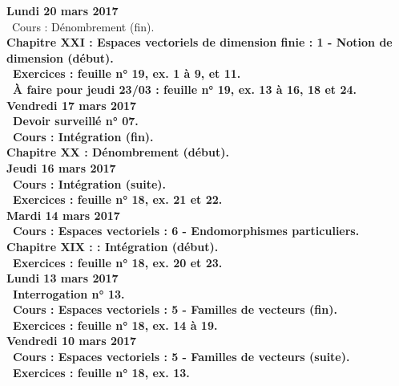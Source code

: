 \documentclass[12pt,a4paper]{article}
\begin{document}
\noindent\textbf{\bf Lundi 20 mars 2017} \\
\bu\ Cours : Dénombrement (fin).\\
\bf Chapitre XXI \rm : Espaces vectoriels de dimension finie  : 1 - Notion de dimension (début).\\
\bu\ Exercices : feuille n° 19, ex. 1 à 9, et 11.\\
\bu\ À faire pour jeudi 23/03 : feuille n° 19, ex. 13 à 16, 18 et 24.\vspace{.4cm}\\

\noindent\textbf{Vendredi 17 mars 2017}\\
\bu\ Devoir surveillé n° 07.\\
\bu\ Cours : Intégration (fin).\\
\bf Chapitre XX \rm : Dénombrement (début).\vspace{.4cm}\\

\noindent\textbf{Jeudi 16 mars 2017}\\
\bu\ Cours : Intégration (suite).\\
\bu\ Exercices : feuille n° 18, ex. 21 et 22.\vspace{.4cm}\\

\noindent\textbf{\bf Mardi 14 mars 2017} \\
\bu\ Cours : Espaces vectoriels : 6 - Endomorphismes particuliers.\\
\bf Chapitre XIX : \rm : Intégration (début).\\
\bu\ Exercices : feuille n° 18, ex. 20 et 23.\vspace{.4cm}\\

\noindent\textbf{\bf Lundi 13 mars 2017} \\
\bu\ Interrogation n° 13.\\
\bu\ Cours : Espaces vectoriels : 5 - Familles de vecteurs (fin).\\
\bu\ Exercices : feuille n° 18, ex. 14 à 19.\vspace{.4cm}\\

\noindent\textbf{Vendredi 10 mars 2017}\\
\bu\ Cours : Espaces vectoriels : 5 - Familles de vecteurs (suite).\\
\bu\ Exercices : feuille n° 18, ex. 13.\vspace{.4cm}\\
\end{document}
